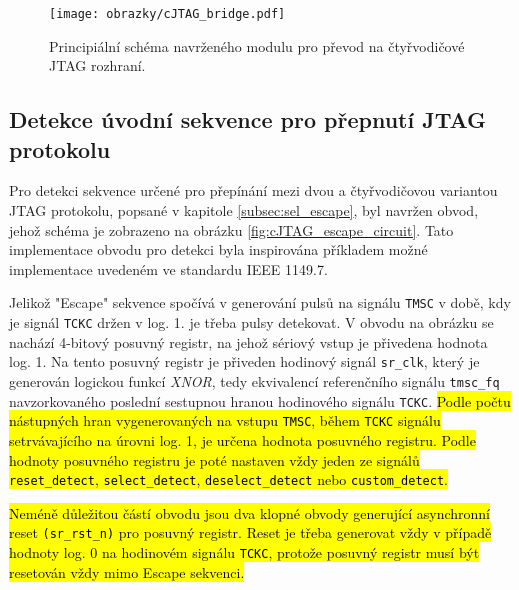\begin{figure}[!h]
  \begin{center}
    \texttt{[image: obrazky/cJTAG\_bridge.pdf]}
  \end{center}
  \caption{Principiální schéma navrženého modulu pro převod na čtyřvodičové \acs{JTAG} rozhraní.}
	\label{fig:cJTAG_bridge}
\end{figure}

\subsection{Detekce úvodní sekvence pro přepnutí \acs{JTAG} protokolu}	\label{subsec:sel_escape_det}
Pro detekci sekvence určené pro přepínání mezi dvou a čtyřvodičovou variantou \acs{JTAG} protokolu, popsané v kapitole \ref{subsec:sel_escape}, byl navržen obvod, jehož schéma je zobrazeno na obrázku \ref{fig:cJTAG_escape_circuit}. Tato implementace obvodu pro detekci byla inspirována příkladem možné implementace uvedeném ve standardu IEEE 1149.7.

Jelikož "Escape" sekvence spočívá v generování pulsů na signálu \texttt{\acs{TMSC}} v době, kdy je signál \texttt{\acs{TCKC}} držen v log. 1. je třeba pulsy detekovat. V obvodu na obrázku se nachází 4-bitový posuvný registr, na jehož sériový vstup je přivedena hodnota log. 1. Na tento posuvný registr je přiveden hodinový signál \texttt{sr\_clk}, který je generován logickou funkcí \textit{XNOR}, tedy ekvivalencí referenčního signálu \texttt{tmsc\_fq} navzorkovaného poslední sestupnou hranou hodinového signálu \texttt{\acs{TCKC}}. \hl{Podle počtu nástupných hran vygenerovaných na vstupu {\texttt{\acs{TMSC}}}, během {\texttt{\acs{TCKC}}} signálu setrvávajícího na úrovni log. 1, je určena hodnota posuvného registru. Podle hodnoty posuvného registru je poté nastaven vždy jeden ze signálů \texttt{reset\_detect}, \texttt{select\_detect}, \texttt{deselect\_detect} nebo \texttt{custom\_detect}.} %

\hl{Neméně důležitou částí obvodu jsou dva klopné obvody generující asynchronní reset \texttt{(sr\_rst\_n)} pro posuvný registr. Reset je třeba generovat vždy v případě hodnoty log. 0 na hodinovém signálu {\texttt{\acs{TCKC}}}, protože posuvný registr musí být resetován vždy mimo Escape sekvenci.} %

